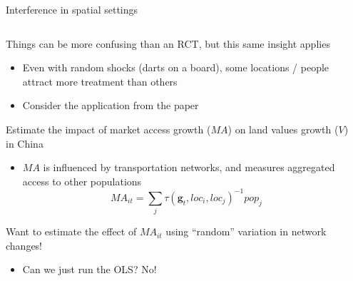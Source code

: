 \documentclass[notes,11pt, aspectratio=169]{beamer}
\newenvironment{wideitemize}{\itemize\addtolength{\itemsep}{10pt}}{\enditemize}
\begin{document}
\begin{frame}{ Interference in spatial settings}
\begin{columns}[T] %
\begin{column}{.95\textwidth}
  \begin{wideitemize}
  \item Things can be more confusing than an RCT, but this same insight applies
    \begin{itemize}
    \item Even with random shocks (darts on a board), some locations / people attract more treatment than others
    \item Consider the application from the paper
    \end{itemize}
  \item Estimate the impact of market access growth ($MA$) on land values growth ($V$) in China
    \begin{itemize}
    \item $MA$ is influenced by transportation networks, and measures aggregated access to other populations
      \begin{equation*}
        MA_{it} = \sum_{j}\tau(\mathbf{g}_{t}, loc_{i}, loc_{j})^{-1}pop_{j}
      \end{equation*}
    \end{itemize}
  \item Want to estimate the effect of $MA_{it}$ using ``random'' variation in network changes!
    \begin{itemize}
    \item Can we just run the OLS? No!
    \end{itemize}
  \end{wideitemize}
\end{column}%
\hfill%
\begin{column}{.45\textwidth}
\end{column}%
\end{columns}
\end{frame}
\end{document}
